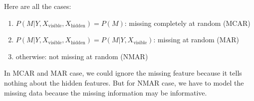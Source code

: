 Here are all the cases:
\begin{enumerate}
    \item $P(M|Y,X_{\text{visible}}, X_{\text{hidden}}) = P(M)$: missing completely at random (MCAR)
    \item $P(M|Y,X_{\text{visible}}, X_{\text{hidden}}) = P(M|Y,X_{\text{visible}})$: missing at random (MAR)
    \item otherwise: not missing at random (NMAR)
\end{enumerate}

In MCAR and MAR case, we could ignore the missing feature because it tells nothing about the hidden features. But for NMAR case, we have to model the missing data because the missing information may be informative.




































































